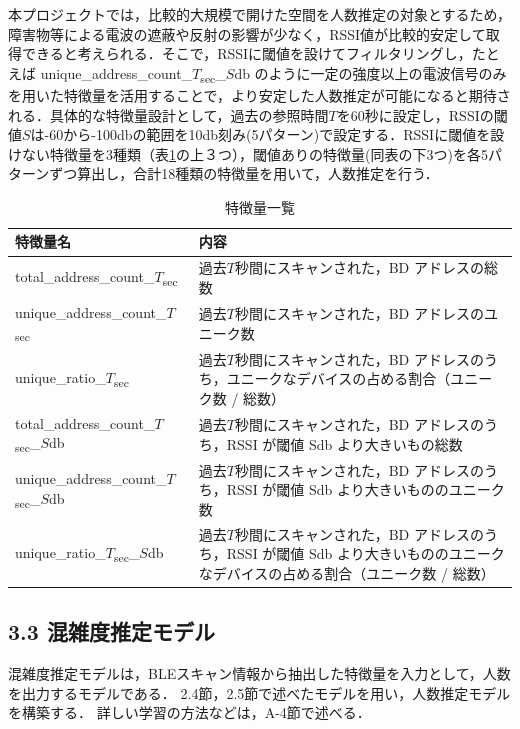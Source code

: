 本プロジェクトでは，比較的大規模で開けた空間を人数推定の対象とするため，障害物等による電波の遮蔽や反射の影響が少なく，RSSI値が比較的安定して取得できると考えられる．そこで，RSSIに閾値を設けてフィルタリングし，たとえば unique\_address\_count\_$T$\textsubscript{sec}\_$S$db のように一定の強度以上の電波信号のみを用いた特徴量を活用することで，より安定した人数推定が可能になると期待される．具体的な特徴量設計として，過去の参照時間$T$を60秒に設定し，RSSIの閾値$S$は-60から-100dbの範囲を10db刻み(5パターン)で設定する．RSSIに閾値を設けない特徴量を3種類（表\ref{tbl:feastures}の上３つ），閾値ありの特徴量(同表の下3つ)を各5パターンずつ算出し，合計18種類の特徴量を用いて，人数推定を行う．

\begin{table}[tb]
	\centering
	\caption{特徴量一覧}
	\label{tbl:feastures}
	\small
	\doublerulesep=0.3pt
    \begin{tabular}{l|p{4cm}} \hline\hline\hline
		特徴量名 & 内容 \\ \hline
		total\_address\_count\_$T$\textsubscript{sec} & 過去$T$秒間にスキャンされた，BD アドレスの総数\\ \hline
		unique\_address\_count\_$T$\textsubscript{sec} & 過去$T$秒間にスキャンされた，BD アドレスのユニーク数 \\ \hline
		unique\_ratio\_$T$\textsubscript{sec} & 過去$T$秒間にスキャンされた，BD アドレスのうち，ユニークなデバイスの占める割合（ユニーク数 / 総数） \\ \hline
		total\_address\_count\_$T$\textsubscript{sec}\_$S$db & 過去$T$秒間にスキャンされた，BD アドレスのうち，RSSI が閾値 Sdb より大きいもの総数 \\ \hline
		unique\_address\_count\_$T$\textsubscript{sec}\_$S$db & 過去$T$秒間にスキャンされた，BD アドレスのうち，RSSI が閾値 Sdb より大きいもののユニーク数 \\ \hline
		unique\_ratio\_$T$\textsubscript{sec}\_$S$db &  過去$T$秒間にスキャンされた，BD アドレスのうち，RSSI が閾値 Sdb より大きいもののユニークなデバイスの占める割合（ユニーク数 / 総数） \\  \hline\hline\hline
	\end{tabular}
\end{table}

\subsection*{3.3 混雑度推定モデル}
混雑度推定モデルは，BLEスキャン情報から抽出した特徴量を入力として，人数を出力するモデルである．
2.4節，2.5節で述べたモデルを用い，人数推定モデルを構築する．
詳しい学習の方法などは，A-4節で述べる．

